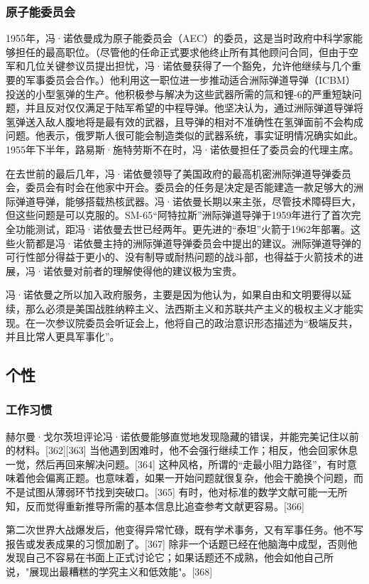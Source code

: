 \subsubsection{原子能委员会}  
1955年，冯·诺依曼成为原子能委员会（AEC）的委员，这是当时政府中科学家能够担任的最高职位。（尽管他的任命正式要求他终止所有其他顾问合同，但由于空军和几位关键参议员提出担忧，冯·诺依曼获得了一个豁免，允许他继续与几个重要的军事委员会合作。）他利用这一职位进一步推动适合洲际弹道导弹（ICBM）投送的小型氢弹的生产。他积极参与解决为这些武器所需的氚和锂-6的严重短缺问题，并且反对仅仅满足于陆军希望的中程导弹。他坚决认为，通过洲际弹道导弹将氢弹送入敌人腹地将是最有效的武器，且导弹的相对不准确性在氢弹面前不会构成问题。他表示，俄罗斯人很可能会制造类似的武器系统，事实证明情况确实如此。1955年下半年，路易斯·施特劳斯不在时，冯·诺依曼担任了委员会的代理主席。

在去世前的最后几年，冯·诺依曼领导了美国政府的最高机密洲际弹道导弹委员会，委员会有时会在他家中开会。委员会的任务是决定是否能建造一款足够大的洲际弹道导弹，能够搭载热核武器。冯·诺依曼长期以来主张，尽管技术障碍巨大，但这些问题是可以克服的。SM-65“阿特拉斯”洲际弹道导弹于1959年进行了首次完全功能测试，距冯·诺依曼去世已经两年。更先进的“泰坦”火箭于1962年部署。这些火箭都是冯·诺依曼主持的洲际弹道导弹委员会中提出的建议。洲际弹道导弹的可行性部分得益于更小的、没有制导或耐热问题的战斗部，也得益于火箭技术的进展，冯·诺依曼对前者的理解使得他的建议极为宝贵。

冯·诺依曼之所以加入政府服务，主要是因为他认为，如果自由和文明要得以延续，那么必须是美国战胜纳粹主义、法西斯主义和苏联共产主义的极权主义才能实现。在一次参议院委员会听证会上，他将自己的政治意识形态描述为“极端反共，并且比常人更具军事化”。
\subsection{个性}  
\subsubsection{工作习惯}  
赫尔曼·戈尔茨坦评论冯·诺依曼能够直觉地发现隐藏的错误，并能完美记住以前的材料。[362][363] 当他遇到困难时，他不会强行继续工作；相反，他会回家休息一觉，然后再回来解决问题。[364] 这种风格，所谓的“走最小阻力路径”，有时意味着他会偏离正题。也意味着，如果一开始问题就很复杂，他会干脆换个问题，而不是试图从薄弱环节找到突破口。[365] 有时，他对标准的数学文献可能一无所知，反而觉得重新推导所需的基本信息比追查参考文献更容易。[366]

第二次世界大战爆发后，他变得异常忙碌，既有学术事务，又有军事任务。他不写报告或发表成果的习惯加剧了。[367] 除非一个话题已经在他脑海中成型，否则他发现自己不容易在书面上正式讨论它；如果话题还不成熟，他会如他自己所说，"展现出最糟糕的学究主义和低效能"。[368]
